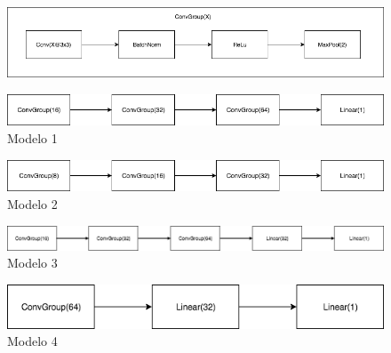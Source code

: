 \documentclass[a4paper, 11pt]{article}
\begin{document}
		
		\begin{figure}[htb!]
			\begin{minipage}{1\textwidth}
				\centering
				\includegraphics[scale=.5]{pics/convgroup}
			\end{minipage}\hfill
		\end{figure}
	

			\begin{figure}[htb!]
		\begin{minipage}{1\textwidth}
			\centering
			\includegraphics[scale=.5]{pics/model1}
					\caption{Modelo 1}
		\end{minipage}\hfill
	\end{figure}


		\begin{figure}[htb!]
	\begin{minipage}{1\textwidth}
		\centering
		\includegraphics[scale=.5]{pics/model2}
				\caption{Modelo 2}
	\end{minipage}\hfill
\end{figure}


		\begin{figure}[htb!]
	\begin{minipage}{1\textwidth}
		\centering
		\includegraphics[scale=.5]{pics/model3}
		\caption{Modelo 3}
	\end{minipage}\hfill
\end{figure}


		\begin{figure}[htb!]
	\begin{minipage}{1\textwidth}
		\centering
		\includegraphics[scale=.5]{pics/model4}
				\caption{Modelo 4}
	\end{minipage}\hfill
\end{figure}		
\end{document}
